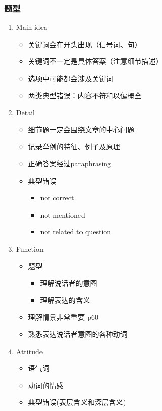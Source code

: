 \documentclass[UTF8]{ctexart}
\begin{document}
\subsubsection{题型}
\begin{enumerate}[A]
  \item Main idea\\
  \begin{itemize}
    \item 关键词会在开头出现（信号词、句）
    \item 关键词不一定是具体答案（注意细节描述）
    \item 选项中可能都会涉及关键词
    \item 两类典型错误：内容不符和以偏概全
  \end{itemize}
  \item Detail\\
  \begin{itemize}
    \item 细节题一定会围绕文章的中心问题
    \item 记录举例的特征、例子及原理
    \item 正确答案经过paraphrasing
    \item 典型错误
    \begin{itemize}
      \item not correct
      \item not mentioned
      \item not related to question
    \end{itemize}
  \end{itemize}
  \item Function
  \begin{itemize}
    \item 题型
    \begin{itemize}
      \item 理解说话者的意图
      \item 理解表达的含义
    \end{itemize}
    \item 理解情景非常重要 p60
    \item 熟悉表达说话者意图的各种动词
  \end{itemize}
  \item Attitude
  \begin{itemize}
    \item 语气词
    \item 动词的情感
    \item 典型错误(表层含义和深层含义)
  \end{itemize}

\end{enumerate}
\end{document}
